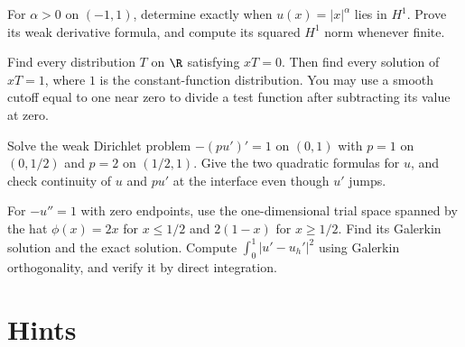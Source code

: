 \begin{exercise}[$\star\star$]\label{ex:v8c11a}
For $\alpha>0$ on $(-1,1)$, determine exactly when $u(x)=|x|^\alpha$ lies in $H^1$. Prove its weak derivative formula, and compute its squared $H^1$ norm whenever finite.
\end{exercise}
\begin{exercise}[$\star\star$]\label{ex:v8c11b}
Find every distribution $T$ on $\R$ satisfying $xT=0$. Then find every solution of $xT=1$, where $1$ is the constant-function distribution. You may use a smooth cutoff equal to one near zero to divide a test function after subtracting its value at zero.
\end{exercise}
\begin{exercise}[$\star\star$]\label{ex:v8c11c}
Solve the weak Dirichlet problem $-(pu')'=1$ on $(0,1)$ with $p=1$ on $(0,1/2)$ and $p=2$ on $(1/2,1)$. Give the two quadratic formulas for $u$, and check continuity of $u$ and $pu'$ at the interface even though $u'$ jumps.
\end{exercise}
\begin{exercise}[$\star\star$]\label{ex:v8c11d}
For $-u''=1$ with zero endpoints, use the one-dimensional trial space spanned by the hat $\phi(x)=2x$ for $x\le1/2$ and $2(1-x)$ for $x\ge1/2$. Find its Galerkin solution and the exact solution. Compute $\int_0^1|u'-u_h'|^2$ using Galerkin orthogonality, and verify it by direct integration.
\end{exercise}

\section{Hints}

